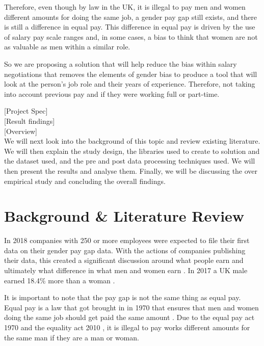 \documentclass{sigchi}
\begin{document}
	Therefore, even though by law in the UK, it is illegal to pay men and women different amounts for doing the same job, a gender pay gap still exists, and there is still a difference in equal pay. This difference in equal pay is driven by the use of salary pay scale ranges and, in some cases, a bias to think that women are not as valuable as men within a similar role.
	
	So we are proposing a solution that will help reduce the bias within salary negotiations that removes the elements of gender bias to produce a tool that will look at the person's job role and their years of experience. Therefore, not taking into account previous pay and if they were working full or part-time.

[Project Spec]\\ %

[Result findings]\\

[Overview]\\
	We will next look into the background of this topic and review existing literature. We will then explain the study design, the libraries used to create to solution and the dataset used, and the pre and post data processing techniques used. We will then present the results and analyse them. Finally, we will be discussing the over empirical study and concluding the overall findings.

\section{Background \& Literature Review}
	In 2018 companies with 250 or more employees were expected to file their first data on their gender pay gap data. With the actions of companies publishing their data, this created a significant discussion around what people earn and ultimately what difference in what men and women earn \cite{bbc_gender_pay_gap}. In 2017 a UK male earned 18.4\% more than a woman \cite{ons_gender_pay_gap_17}. 
	
	It is important to note that the pay gap is not the same thing as equal pay. Equal pay is a law that got brought in in 1970 that ensures that men and women doing the same job should get paid the same amount \cite{bbc_gender_pay_gap}. Due to the equal pay act 1970 \cite{equal_pay_act_1070} and the equality act 2010 \cite{equal_act_2010}, it is illegal to pay works different amounts for the same man if they are a man or woman.
	
\end{document}
